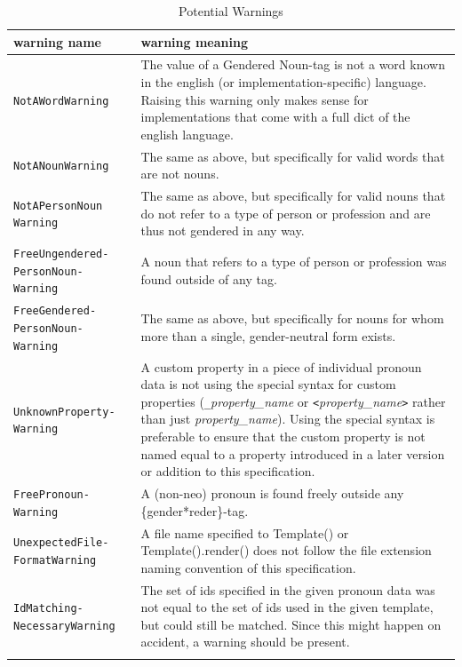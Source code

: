 \documentclass{article}
\begin{document}
    \begin{flushleft}
        \begin{center}
            \begin{longtable}{|>{\raggedright\arraybackslash}p{8em} | >{\raggedright\arraybackslash}p{28em} |}
                 \hline
                 warning name & warning meaning\\
                 \hline\hline
                 \texttt{NotAWordWarning} & The value of a Gendered Noun-tag is not a word known in the english (or implementation-specific) language.
                 Raising this warning only makes sense for implementations that come with a full dict of the english language.\\
                 \hline
                 \texttt{NotANounWarning} & The same as above, but specifically for valid words that are not nouns.\\
                 \hline
                 \texttt{NotAPersonNoun Warning} & The same as above, but specifically for valid nouns that do not refer to a type of person or profession and are thus not gendered in any way.\\
                 \hline
                 \texttt{FreeUngendered- PersonNoun- Warning} & A noun that refers to a type of person or profession was found outside of any tag.\\
                 \hline
                 \texttt{FreeGendered- PersonNoun- Warning} & The same as above, but specifically for nouns for whom more than a single, gender-neutral form exists.\\
                 \hline
                 \texttt{UnknownProperty- Warning} & A custom property in a piece of individual pronoun data is not using the special syntax for custom properties (\texttt{\_}\emph{property\_name} or \texttt{<}\emph{property\_name}\texttt{>} rather than just \emph{property\_name}).
                 Using the special syntax is preferable to ensure that the custom property is not named equal to a property introduced in a later version or addition to this specification.\\
                 \hline
                 \texttt{FreePronoun- Warning} & A (non-neo) pronoun is found freely outside any \{gender*reder\}-tag.\\
                 \hline
                 \texttt{UnexpectedFile- FormatWarning} & A file name specified to Template() or Template().render() does not follow the file extension naming convention of this specification.\\
                 \hline
                 \texttt{IdMatching- NecessaryWarning} & The set of ids specified in the given pronoun data was not equal to the set of ids used in the given template, but could still be matched.
                 Since this might happen on accident, a warning should be present.\\
                 \hline
                \caption{Potential Warnings}
            \end{longtable}
        \end{center}
    \end{flushleft}
\end{document}
